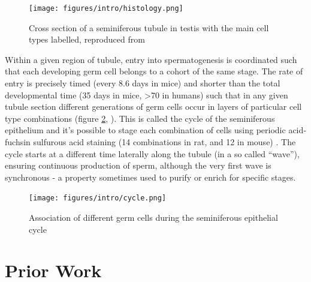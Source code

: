 \begin{figure}[H]
	\centering
	\texttt{[image: figures/intro/histology.png]}
	\caption[Testis Anatomy]{Cross section of a seminiferous tubule in testis with the main cell types labelled, reproduced from~\cite{Junqueira2005Basic}}
	\label{fig:histology}
\end{figure}

Within a given region of tubule, entry into spermatogenesis is coordinated such that each developing germ cell belongs to a cohort of the same stage. The rate of entry is precisely timed (every 8.6 days in mice) and shorter than the total developmental time (35 days in mice, >70 in humans) such that in any given tubule section different generations of germ cells occur in layers of particular cell type combinations (figure \ref{fig:cycle}, \cite{Oakberg1956Duration,Clermont1969Duration, Heller1969Human}). This is called the cycle of the seminiferous epithelium and it's possible to stage each combination of cells using periodic acid‐fuchsin sulfurous acid staining (14 combinations in rat, and 12 in mouse) \parencite{Leblond1952Spermiogenesis, Leblond1952Definition, Oakberg1956description}. The cycle starts at a different time laterally along the tubule (in a so called ``wave''), ensuring continuous production of sperm, although the very first wave is synchronous - a property sometimes used to purify or enrich for specific stages.

\begin{figure}[H]
	\centering
	\texttt{[image: figures/intro/cycle.png]}
	\caption[Seminiferous Cycle]{Association of different germ cells during the seminiferous epithelial cycle~\cite[Reproduced from ][]{Monesi1978Chapter}}
	\label{fig:cycle}
\end{figure}











\begin{figure}[H]
	\centering
\end{figure}











\section{Prior Work}

